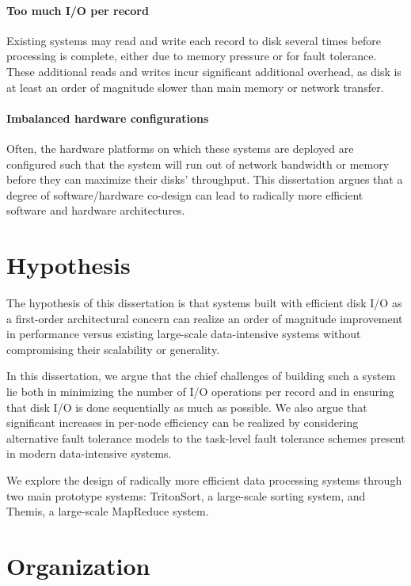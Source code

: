 \paragraph{Too much I/O per record} Existing
systems may read and write each record to disk several times before processing
is complete, either due to memory pressure or for fault tolerance. These
additional reads and writes incur significant additional overhead, as disk is
at least an order of magnitude slower than main memory or network transfer.

\paragraph{Imbalanced hardware configurations} Often, the hardware platforms on
which these systems are deployed are configured such that the system will run
out of network bandwidth or memory before they can maximize their disks'
throughput. This dissertation argues that a degree of software/hardware
co-design can lead to radically more efficient software and hardware
architectures.

\section{Hypothesis}

The hypothesis of this dissertation is that systems built with efficient disk
I/O as a first-order architectural concern can realize an order of magnitude
improvement in performance versus existing large-scale data-intensive systems
without compromising their scalability or generality.

In this dissertation, we argue that the chief challenges of building such a
system lie both in minimizing the number of I/O operations per record and in
ensuring that disk I/O is done sequentially as much as possible. We also argue
that significant increases in per-node efficiency can be realized by
considering alternative fault tolerance models to the task-level fault
tolerance schemes present in modern data-intensive systems.

We explore the design of radically more efficient data processing systems
through two main prototype systems: TritonSort, a large-scale sorting system,
and Themis, a large-scale MapReduce system.

\section{Organization}

